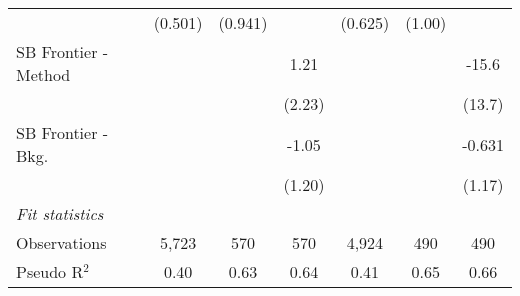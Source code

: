 \begin{tabular}{lcccccc}
                        & (0.501)      & (0.941) &             & (0.625) & (1.00)  &   \\   
   SB Frontier - Method &              &         & 1.21        &         &         & -15.6\\   
                        &              &         & (2.23)      &         &         & (13.7)\\   
   SB Frontier - Bkg.   &              &         & -1.05       &         &         & -0.631\\   
                        &              &         & (1.20)      &         &         & (1.17)\\   
   \midrule
   \emph{Fit statistics}\\
   Observations         & 5,723        & 570     & 570         & 4,924   & 490     & 490\\  
   Pseudo R$^2$         & 0.40         & 0.63    & 0.64        & 0.41    & 0.65    & 0.66\\  
   

\end{tabular}

